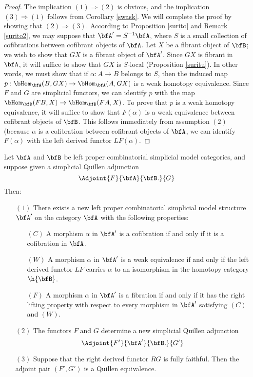 \begin{Simplicial Categories}
\begin{proof}
The implication $(1) \Rightarrow (2)$ is obvious, and the implication $(3) \Rightarrow (1)$ follows
from Corollary \ref{swask}. We will complete the proof by showing that $(2) \Rightarrow (3)$.
According to Proposition \ref{surito} and Remark \ref{surito2}, we may suppose that $\bfA' = S^{-1} \bfA$, where $S$ is a small collection of cofibrations between cofibrant objects of $\bfA$. Let $X$ be a fibrant object of $\bfB$; we wish to show that $GX$ is a fibrant object of $\bfA'$. Since $GX$ is fibrant in
$\bfA$, it will suffice to show that $GX$ is $S$-local (Proposition \ref{suritu}). In other words, we
must show that if $\alpha: A \rightarrow B$ belongs to $S$, then the induced map
$p: \bHom_{\bfA}( B, GX) \rightarrow \bHom_{\bfA}( A, GX)$ is a weak homotopy equivalence.
Since $F$ and $G$ are simplicial functors, we can identify $p$ with the map
$\bHom_{\bfB}( FB, X) \rightarrow \bHom_{\bfB}( FA, X)$. To prove that $p$ is a weak homotopy equivalence, it will suffice to show that $F(\alpha)$ is a weak equivalence between cofibrant objects
of $\bfB$. This follows immediately from assumption $(2)$ (because $\alpha$ is a cofibration between cofibrant objects of $\bfA$, we can identify $F(\alpha)$ with the left derived functor $LF(\alpha)$.
\end{proof}

\begin{corollary}\label{swinker}
Let $\bfA$ and $\bfB$ be left proper combinatorial simplicial model categories, and suppose given
a simplicial Quillen adjunction
$$ \Adjoint{F}{\bfA}{\bfB.}{G}$$
Then:
\begin{itemize}
\item[$(1)$] There exists a new left proper combinatorial simplicial model structure $\bfA'$ on the category $\bfA$ with the following properties:
\begin{itemize}
\item[$(C)$] A morphism $\alpha$ in $\bfA'$ is a cofibration if and only if it is a cofibration in $\bfA$.
\item[$(W)$] A morphism $\alpha$ in $\bfA'$ is a weak equivalence if and only if the left
derived functor $LF$ carries $\alpha$ to an isomorphism in the homotopy category $\h{\bfB}$.
\item[$(F)$] A morphism $\alpha$ in $\bfA'$ is a fibration if and only if it has the right lifting
property with respect to every morphism in $\bfA'$ satisfying $(C)$ and $(W)$.
\end{itemize}
\item[$(2)$] The functors $F$ and $G$ determine a new simplicial Quillen adjunction
$$ \Adjoint{F'}{\bfA'}{\bfB.}{G'}$$
\item[$(3)$] Suppose that the right derived functor $RG$ is fully faithful. 
Then the adjoint pair $(F',G')$ is a Quillen equivalence.
\end{itemize}
\end{corollary}


\end{Simplicial Categories}
